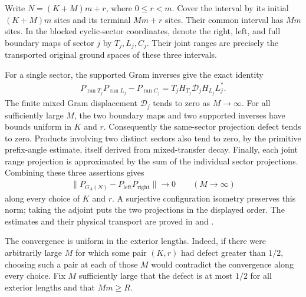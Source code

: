 \documentclass{article}
\begin{document}
Write $N=(K+M)m+r$, where $0\leq r<m$. Cover the interval by its initial
$(K+M)m$ sites and its terminal $Mm+r$ sites. Their common interval has
$Mm$ sites. In the blocked cyclic-sector coordinates, denote the right,
left, and full boundary maps of sector $j$ by $T_j,L_j,C_j$. Their joint
ranges are precisely the transported original ground spaces of these
three intervals.

For a single sector, the supported Gram inverses give the exact identity
\begin{align}
  P_{\operatorname{ran}T_j}P_{\operatorname{ran}L_j}
     -P_{\operatorname{ran}C_j}
   =T_jH_{T_j}\mathcal D_jH_{L_j}L_j^*.
\end{align}
The finite mixed Gram displacement $\mathcal D_j$ tends to zero as
$M\to\infty$. For all sufficiently large $M$, the two boundary maps and two supported
inverses have bounds uniform in $K$ and $r$. Consequently the same-sector
projection defect tends to zero. Products involving two distinct sectors
also tend to zero, by the primitive prefix-angle estimate, itself derived from mixed-transfer decay. Finally, each joint
range projection is approximated by the sum of the individual sector
projections. Combining these three assertions gives
\begin{align}
  \|P_{G_A(N)}-P_{\mathrm{left}}P_{\mathrm{right}}\|
     \longrightarrow0
  \qquad(M\to\infty)
\end{align}
along every choice of $K$ and $r$. A surjective configuration isometry
preserves this norm; taking the adjoint puts the two projections in the
displayed order.
The estimates and their physical transport are proved in
 and
.

The convergence is uniform in the exterior lengths. Indeed, if there were
arbitrarily large $M$ for which some pair $(K,r)$ had defect greater than
$1/2$, choosing such a pair at each of those $M$ would contradict the
convergence along every choice. Fix $M$ sufficiently large that the defect
is at most $1/2$ for all exterior lengths and that $Mm\geq R$.
\end{document}
